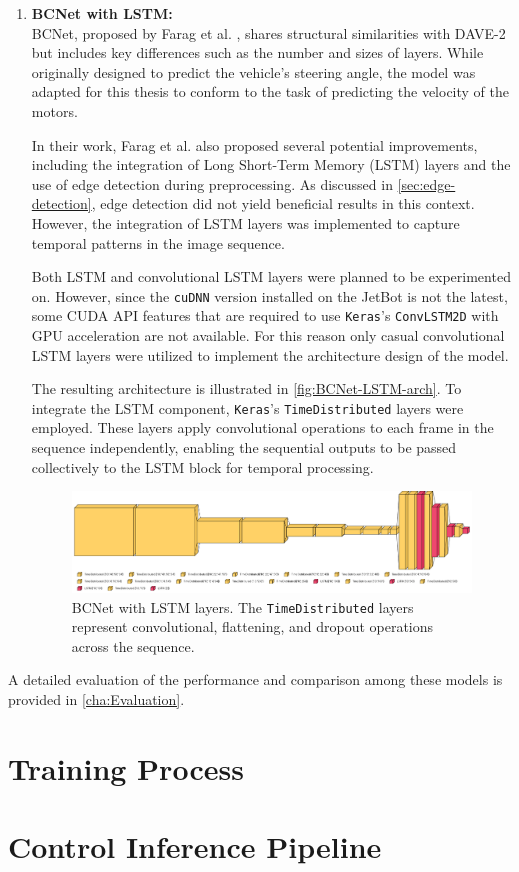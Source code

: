 \begin{enumerate}
  \item \textbf{BCNet with LSTM:} \\
    BCNet, proposed by Farag et al. \autocite{8855753}, shares structural similarities with DAVE-2 but includes key differences such as the number and sizes of layers. While originally designed to predict the vehicle’s steering angle, the model was adapted for this thesis to conform to the task of predicting the velocity of the motors.

    In their work, Farag et al. also proposed several potential improvements, including the integration of Long Short-Term Memory (LSTM) layers and the use of edge detection during preprocessing. As discussed in \autoref{sec:edge-detection}, edge detection did not yield beneficial results in this context. However, the integration of LSTM layers was implemented to capture temporal patterns in the image sequence.

    Both LSTM and convolutional LSTM layers were planned to be experimented on. However, since the \texttt{cuDNN} version installed on the JetBot is not the latest, some CUDA API features that are required to use \texttt{Keras}’s \texttt{ConvLSTM2D} with GPU acceleration are not available. For this reason only casual convolutional LSTM layers were utilized to implement the architecture design of the model.

    The resulting architecture is illustrated in \autoref{fig:BCNet-LSTM-arch}. To integrate the LSTM component, \texttt{Keras}’s \texttt{TimeDistributed} layers were employed. These layers apply convolutional operations to each frame in the sequence independently, enabling the sequential outputs to be passed collectively to the LSTM block for temporal processing.

    \begin{figure}[htbp]
      \centering
      \includegraphics[width=1.0\textwidth]{Images/BCNetLSTM_architecture.png}
      \caption{BCNet with LSTM layers. The \texttt{TimeDistributed} layers represent convolutional, flattening, and dropout operations across the sequence.}
      \label{fig:BCNet-LSTM-arch}
    \end{figure}
\end{enumerate}

A detailed evaluation of the performance and comparison among these models is provided in \autoref{cha:Evaluation}.

\section{Training Process}

\section{Control Inference Pipeline}
\label{sec:pipeline}

